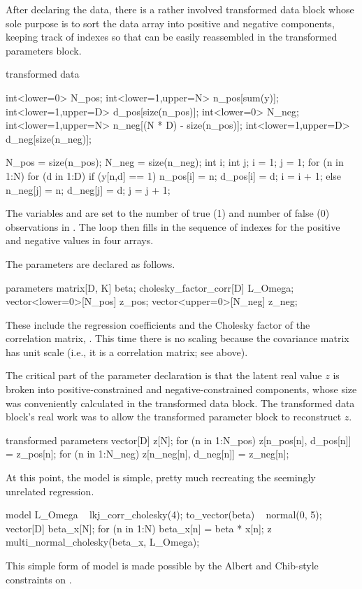 After declaring the data, there is a rather involved transformed data
block whose sole purpose is to sort the data array  into
positive and negative components, keeping track of indexes so that
 can be easily reassembled in the transformed parameters
block.
%
\begin{stancode}
transformed data {
  int<lower=0> N_pos;
  int<lower=1,upper=N> n_pos[sum(y)];
  int<lower=1,upper=D> d_pos[size(n_pos)];
  int<lower=0> N_neg;
  int<lower=1,upper=N> n_neg[(N * D) - size(n_pos)];
  int<lower=1,upper=D> d_neg[size(n_neg)];

  N_pos = size(n_pos);
  N_neg = size(n_neg);
  {
    int i;
    int j;
    i = 1;
    j = 1;
    for (n in 1:N) {
      for (d in 1:D) {
        if (y[n,d] == 1) {
          n_pos[i] = n;
          d_pos[i] = d;
          i = i + 1;
        } else {
          n_neg[j] = n;
          d_neg[j] = d;
          j = j + 1;
        }
      }
    }
  }
}
\end{stancode}
%
The variables  and  are set to the number of
true (1) and number of false (0) observations in .  The loop
then fills in the sequence of indexes for the positive and negative
values in four arrays.

The parameters are declared as follows.
%
\begin{stancode}
parameters {
  matrix[D, K] beta;
  cholesky_factor_corr[D] L_Omega;
  vector<lower=0>[N_pos] z_pos;
  vector<upper=0>[N_neg] z_neg;
}
\end{stancode}
%
These include the regression coefficients  and the Cholesky
factor of the correlation matrix, .  This time there is
no scaling because the covariance matrix has unit scale (i.e., it is a
correlation matrix;  see above). 

The critical part of the parameter declaration is that the latent real
value $z$ is broken into positive-constrained and negative-constrained
components, whose size was conveniently calculated in the transformed
data block.  The transformed data block's real work was to allow the
transformed parameter block to reconstruct $z$.
%
\begin{stancode}
transformed parameters {
  vector[D] z[N];
  for (n in 1:N_pos)
    z[n_pos[n], d_pos[n]] = z_pos[n];
  for (n in 1:N_neg)
    z[n_neg[n], d_neg[n]] = z_neg[n];
}
\end{stancode}

At this point, the model is simple, pretty much recreating the
seemingly unrelated regression.
%
\begin{stancode}
model {
  L_Omega ~ lkj_corr_cholesky(4);
  to_vector(beta) ~ normal(0, 5);
  { 
    vector[D] beta_x[N];
    for (n in 1:N) 
      beta_x[n] = beta * x[n];
    z ~ multi_normal_cholesky(beta_x, L_Omega);
  }
}
\end{stancode}
%
This simple form of model is made possible by the Albert and
Chib-style constraints on .

